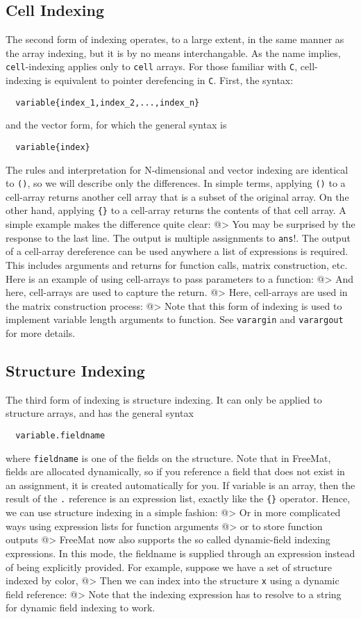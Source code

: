\subsection{Cell Indexing}

The second form of indexing operates, to a large extent, in
the same manner as the array indexing, but it is by no means
interchangable.  As the name implies, \verb|cell|-indexing applies
only to \verb|cell| arrays.  For those familiar with \verb|C|, cell-
indexing is equivalent to pointer derefencing in \verb|C|.  First,
the syntax:
\begin{verbatim}
  variable{index_1,index_2,...,index_n}
\end{verbatim}
and the vector form, for which the general syntax is
\begin{verbatim}
  variable{index}
\end{verbatim}
The rules and interpretation for N-dimensional and vector indexing
are identical to \verb|()|, so we will describe only the differences.
In simple terms, applying \verb|()| to a cell-array returns another
cell array that is a subset of the original array.  On the other
hand, applying \verb|{}| to a cell-array returns the contents of that
cell array.  A simple example makes the difference quite clear:
@>
You may be surprised by the response to the last line.  The output
is multiple assignments to \verb|ans|!.  The output of a cell-array
dereference can be used anywhere a list of expressions is required.
This includes arguments and returns for function calls, matrix
construction, etc.  Here is an example of using cell-arrays to pass
parameters to a function:
@>
And here, cell-arrays are used to capture the return.
@>
Here, cell-arrays are used in the matrix construction process:
@>
Note that this form of indexing is used to implement variable
length arguments to function.  See \verb|varargin| and \verb|varargout|
for more details.
\subsection{Structure Indexing}

The third form of indexing is structure indexing.  It can only
be applied to structure arrays, and has the general syntax
\begin{verbatim}
  variable.fieldname
\end{verbatim}
where \verb|fieldname| is one of the fields on the structure.  Note that
in FreeMat, fields are allocated dynamically, so if you reference
a field that does not exist in an assignment, it is created automatically
for you.  If variable is an array, then the result of the \verb|.| 
reference is an expression list, exactly like the \verb|{}| operator.  Hence,
we can use structure indexing in a simple fashion:
@>
Or in more complicated ways using expression lists for function arguments
@>
or to store function outputs
@>
FreeMat now also supports the so called dynamic-field indexing 
expressions.  In this mode, the fieldname is supplied through 
an expression instead of being explicitly provided.  For example,
suppose we have a set of structure indexed by color,
@>
Then we can index into the structure \verb|x| using a dynamic field
reference:
@>
Note that the indexing expression has to resolve to a string for
dynamic field indexing to work.
